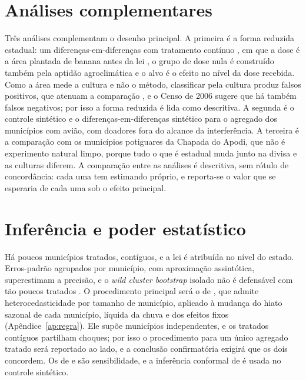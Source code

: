 \section{Análises complementares}
\label{sec:secundarias}

Três análises complementam o desenho principal. A primeira é a forma reduzida
estadual: um diferenças-em-diferenças com tratamento contínuo
\cite{callaway2024continuous}, em que a dose é a área plantada de banana antes
da lei \cite{ibgepam}, o grupo de dose nula é construído também pela aptidão
agroclimática e o alvo é o efeito no nível da dose recebida. Como a área mede
a cultura e não o método, classificar pela cultura produz falsos positivos,
que atenuam a comparação \cite{denteh2022misclassification}, e o Censo de 2006
sugere que há também falsos negativos; por isso a forma reduzida é lida como
descritiva. A segunda é o controle sintético e o diferenças-em-diferenças
sintético \cite{arkhangelsky2021sdid} para o agregado dos municípios com
avião, com doadores fora do alcance da interferência. A terceira é a
comparação com os municípios potiguares da Chapada do Apodi, que não é
experimento natural limpo, porque tudo o que é estadual muda junto na divisa e
as culturas diferem. A comparação entre as análises é descritiva, sem rótulo
de concordância: cada uma tem estimando próprio, e reporta-se o valor que se
esperaria de cada uma sob o efeito principal.

\section{Inferência e poder estatístico}
\label{sec:inferencia}

Há poucos municípios tratados, contíguos, e a lei é atribuída no nível do
estado. Erros-padrão agrupados por município, com aproximação assintótica,
superestimam a precisão, e o \emph{wild cluster bootstrap} isolado não é
defensável com tão poucos tratados \cite{mackinnon2018wild}. O procedimento
principal será o de , que admite
heterocedasticidade por tamanho de município, aplicado à mudança do hiato
sazonal de cada município, líquida da chuva e dos efeitos fixos
(Apêndice~\ref{ap:regra}). Ele supõe municípios independentes, e os tratados
contíguos partilham choques; por isso o procedimento para um único agregado
tratado \cite{hagemann2025single} será reportado ao lado, e a conclusão
confirmatória exigirá que os dois concordem. Os de  e
 são sensibilidade, e a inferência conformal de
 é usada no controle sintético.

